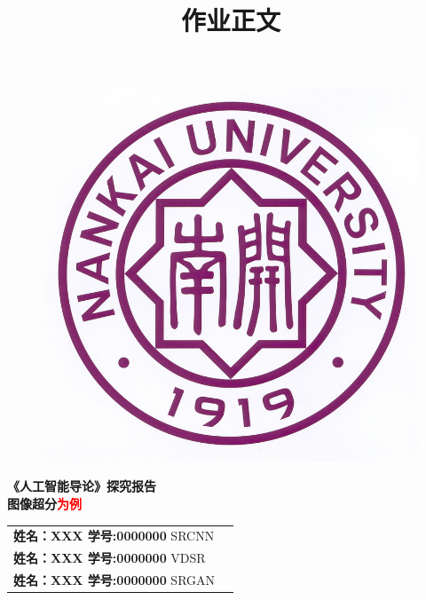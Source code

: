 \documentclass[12pt,AutoFakeBold]{article}
\begin{document}
\begin{figure}[h]
    \centering
    \includegraphics[width=.7\linewidth]{figures/logo.jpeg}
\end{figure}

\vspace{1cm}
\hrulefill
    \begin{center}
        \Huge\textbf{《人工智能导论》探究报告\\ 图像超分\textcolor{red}{为例} }
     
    \end{center}   

\hrulefill
\vspace{1cm}

\begin{table}[h]
    \centering
    \large
    \begin{tabular}{ll}
    \textbf{姓名：XXX   \quad  学号:0000000} \quad SRCNN  \\
    \textbf{姓名：XXX    \quad  学号:0000000} \quad VDSR \\
    \textbf{姓名：XXX    \quad  学号:0000000} \quad SRGAN \\
    \end{tabular}
\end{table}

\newpage


\title{\kaishu 作业正文}

\maketitle
\end{document}
